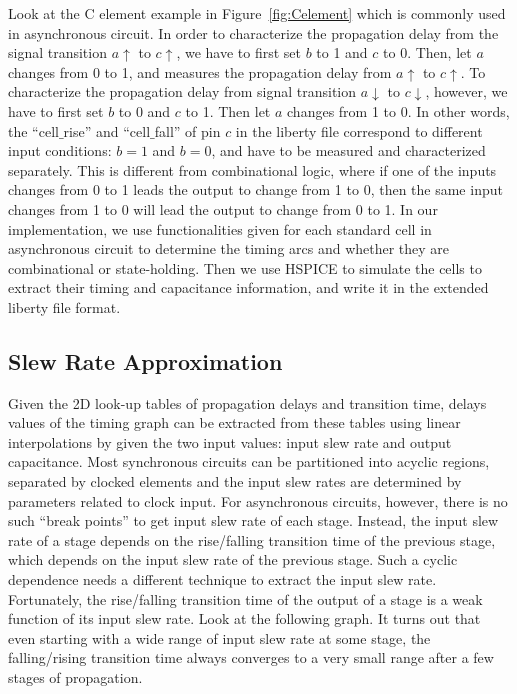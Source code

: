 \documentclass[sigconf, 10pt, twocolumn]{acmart}
\begin{document}
Look at the C element example in Figure~\ref{fig:Celement} which is commonly used in asynchronous circuit. In order to characterize the propagation delay from the signal transition $a\uparrow$ to $c\uparrow$, we have to first set $b$ to 1 and $c$ to 0. Then, let $a$ changes from 0 to 1, and measures the propagation delay from $a\uparrow$ to $c\uparrow$. To characterize the propagation delay from signal transition $a\downarrow$ to $c\downarrow$, however, we have to first set $b$ to 0 and $c$ to 1. Then let $a$ changes from 1 to 0. In other words, the ``cell$\_$rise'' and ``cell$\_$fall'' of pin $c$ in the liberty file correspond to different input conditions: $b = 1$ and $b = 0$, and have to be measured and characterized separately. This is different from combinational logic, where if one of the inputs changes from 0 to 1 leads the output to change from 1 to 0, then the same input changes from 1 to 0 will lead the output to change from 0 to 1.
In our implementation, we use functionalities given for each standard cell in asynchronous circuit to determine the timing arcs and whether they are combinational or state-holding. Then we use HSPICE to simulate the cells to extract their timing and capacitance information, and write it in the extended liberty file format.
\subsection{Slew Rate Approximation}
Given the 2D look-up tables of propagation delays and transition time, delays values of the timing graph can be extracted from these tables using linear interpolations by given the two input values: input slew rate and output capacitance. Most synchronous circuits can be partitioned into acyclic regions, separated by clocked elements and the input slew rates are determined by parameters related to clock input. For asynchronous circuits, however, there is no such ``break points'' to get input slew rate of each stage. Instead, the input slew rate of a stage depends on the rise/falling transition time of the previous stage, which depends on the input slew rate of the previous stage. Such a cyclic dependence needs a different technique to extract the input slew rate. Fortunately, the rise/falling transition time of the output of a stage is a weak function of its input slew rate. Look at the following graph. It turns out that even starting with a wide range of input slew rate at some stage, the falling/rising transition time always converges to a very small range after a few stages of propagation.
\end{document}
